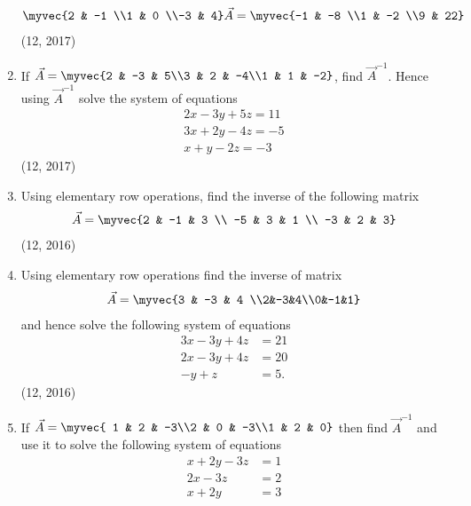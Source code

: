 \begin{enumerate}[label=\thesubsection.\arabic*,ref=\thesubsection.\theenumi]
\begin{align*}
   \myvec{2 & -1 \\1 & 0 \\-3 & 4} \vec{A}=\myvec{-1 & -8 \\1 & -2 \\9 & 22} 
\end{align*} 
\hfill (12, 2017)
 \item If $\vec{A}=\myvec{2 & -3 & 5\\3 & 2 & -4\\1 & 1 & -2}$, find $\vec{A}^{-1}$. Hence using $\vec{A}^{-1}$ solve the system of equations \begin{align*}
    2x-3y+5z=11\\3x+2y-4z=-5\\x+y-2z=-3
\end{align*}
\hfill (12, 2017)
    \item Using elementary row operations, find the inverse of the following matrix 
          \begin{align*}
              \vec{A} = \myvec{2 & -1 & 3  \\
              -5           & 3  & 1  \\
              -3           & 2  & 3}
          \end{align*}
\hfill (12, 2016)
    \item Using elementary row operations find the inverse of matrix
          \begin{align*}
              \vec{A} =\myvec{3 & -3 & 4 \\2&-3&4\\0&-1&1}
          \end{align*}
          and hence solve the following system of equations
          \begin{align*}
              3x-3y+4z & =21 \\
              2x-3y+4z & =20 \\
              -y+z     & =5.
          \end{align*}
\hfill (12, 2016)
\item If $\vec{A}=\myvec{ 1 & 2 & -3\\2 & 0 & -3\\1 & 2 & 0}$ then find $\vec{A}^{-1}$ and use it to solve the following system of equations 
	\begin{align*}  
		x + 2y -3z&= 1\\
		2x-3z & =2\\
                x+ 2y &=3 
	\end{align*}

\end{enumerate}
